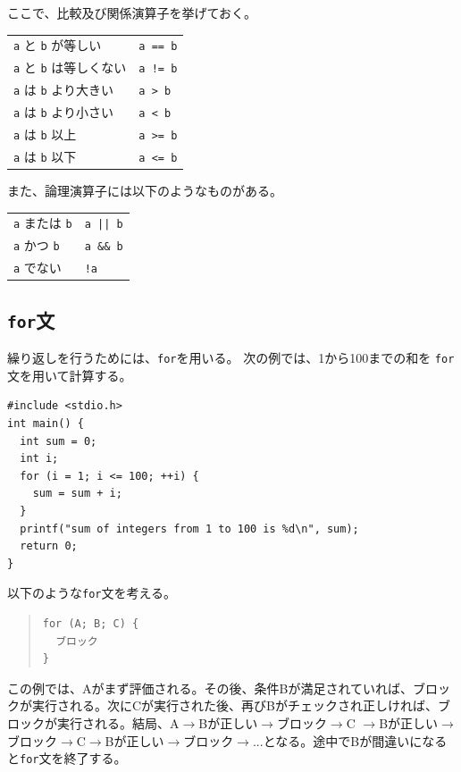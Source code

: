 ここで、比較及び関係演算子を挙げておく。
\begin{table}[H]
  \begin{center}
  \begin{tabular}{ll}
    \verb|a| と \verb|b| が等しい      & \verb|a == b| \\
    \verb|a| と \verb|b| は等しくない  & \verb|a != b| \\
    \verb|a| は \verb|b| より大きい    & \verb|a > b|  \\
    \verb|a| は \verb|b| より小さい    & \verb|a < b|  \\
    \verb|a| は \verb|b| 以上          & \verb|a >= b| \\
    \verb|a| は \verb|b| 以下          & \verb|a <= b|
\end{tabular}
\end{center}
\end{table} \noindent
また、論理演算子には以下のようなものがある。
\begin{table}[H]
\begin{center}
\begin{tabular}{ll}
  \verb|a| または \verb|b| & \verb+a || b+ \\
  \verb|a| かつ \verb|b|   & \verb|a && b| \\
  \verb|a| でない  & \verb|!a| \\
\end{tabular}
\end{center}
\end{table}
	
\subsection{{\tt for}文}
繰り返しを行うためには、\verb|for|を用いる。
次の例では、1から100までの和を \verb|for| 文を用いて計算する。
\begin{reidai}\label{ex:for}
\begin{verbatim}
#include <stdio.h>
int main() {
  int sum = 0;
  int i;
  for (i = 1; i <= 100; ++i) {
    sum = sum + i;
  }
  printf("sum of integers from 1 to 100 is %d\n", sum);
  return 0;
}
\end{verbatim}
\end{reidai} \noindent
以下のような\verb|for|文を考える。
\begin{quote}
\begin{verbatim}
for (A; B; C) {
  ブロック
}
\end{verbatim}
\end{quote}
この例では、Aがまず評価される。その後、条件Bが満足されていれば、ブロックが実行される。次にCが実行された後、再びBがチェックされ正しければ、ブロックが実行される。結局、A$\to$Bが正しい$\to$ブロック$\to$C $\to$Bが正しい$\to$ブロック$\to$C$\to$Bが正しい$\to$ブロック$\to$...となる。途中でBが間違いになると\verb|for|文を終了する。

